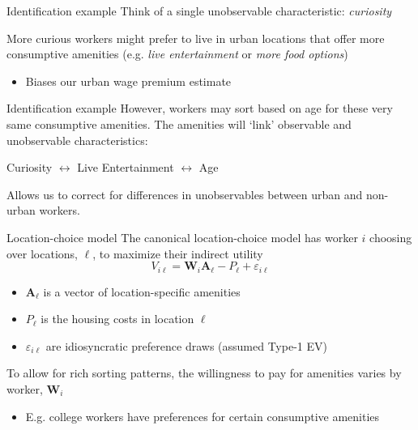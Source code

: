 \documentclass[aspectratio=169,t]{beamer}
\begin{document}
\begin{frame}{Identification example}
  Think of a single unobservable characteristic: \emph{curiosity}

  \bigskip
  More curious workers might prefer to live in urban locations that offer more consumptive amenities (e.g. \emph{live entertainment} or \emph{more food options})
  \begin{itemize}
    \item Biases our urban wage premium estimate
  \end{itemize}
\end{frame}

\begin{frame}{Identification example}
  However, workers may sort based on age for these very same consumptive amenities.
  The amenities will `link' observable and unobservable characteristics:

  \begin{center}\large
    Curiosity $\leftrightarrow$ Live Entertainment $\leftrightarrow$ Age
  \end{center}

  \bigskip
  Allows us to correct for differences in unobservables between urban and non-urban workers. 
\end{frame}

\begin{frame}{Location-choice model}
  The canonical location-choice model has worker $i$ choosing over locations, $\ell$, to maximize their indirect utility 
  \vspace*{-\bigskipamount}
  $$
    V_{i \ell} = \bm{W}_i \bm{A}_\ell - {P}_\ell + \varepsilon_{i \ell} 
  $$
  
  \vspace*{-\medskipamount}
  \begin{itemize}
    \item $\bm{A}_\ell$ is a vector of location-specific amenities
    \item $P_\ell$ is the housing costs in location $\ell$
    \item $\varepsilon_{i \ell}$ are idiosyncratic preference draws (assumed Type-1 EV)
  \end{itemize}

  \bigskip
  To allow for rich sorting patterns, the willingness to pay for amenities varies by worker, $\bm{W}_i$
  \begin{itemize}
    \item E.g. college workers have preferences for certain consumptive amenities \citep{Diamond_2016}
  \end{itemize}
\end{frame}
\end{document}
